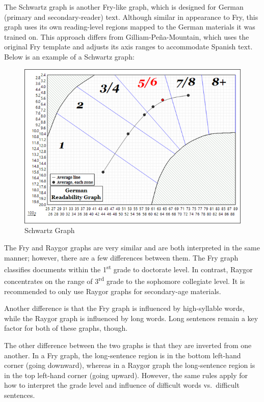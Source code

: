 \documentclass[
]{book}
\theoremstyle{definition}
\theoremstyle{definition}
\theoremstyle{definition}
\theoremstyle{definition}
\theoremstyle{remark}
\begin{document}
The Schwartz graph is another Fry-like graph, which is designed for German (primary and secondary-reader) text. Although similar in appearance to Fry, this graph uses its own reading-level regions mapped to the German materials it was trained on. This approach differs from Gilliam-Peña-Mountain, which uses the original Fry template and adjusts its axis ranges to accommodate Spanish text. Below is an example of a Schwartz graph:

\begin{figure}[H]

{\centering \includegraphics[width=0.75\linewidth,]{Images/Schwartz} 

}

\caption{Schwartz Graph}\label{fig:schwartz2}
\end{figure}

The Fry and Raygor graphs are very similar and are both interpreted in the same manner; however, there are a few differences between them. The Fry graph classifies documents within the 1\textsuperscript{st} grade to doctorate level. In contrast, Raygor concentrates on the range of 3\textsuperscript{rd} grade to the sophomore collegiate level. It is recommended to only use Raygor graphs for secondary-age materials.

Another difference is that the Fry graph is influenced by high-syllable words, while the Raygor graph is influenced by long words. Long sentences remain a key factor for both of these graphs, though.

The other difference between the two graphs is that they are inverted from one another. In a Fry graph, the long-sentence region is in the bottom left-hand corner (going downward), whereas in a Raygor graph the long-sentence region is in the top left-hand corner (going upward). However, the same rules apply for how to interpret the grade level and influence of difficult words vs.~difficult sentences.
\end{document}
